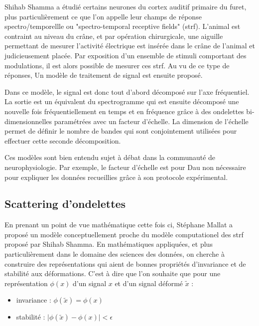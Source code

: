 Shihab Shamma a étudié certains neurones du cortex auditif primaire du furet, plus particulièrement ce que l'on appelle leur champs de réponse spectro/temporellle ou "spectro-temporal receptive fields" (strf). L'animal est contraint au niveau du crâne, et par opération chirurgicale, une aiguille permettant de mesurer l'activité électrique est insérée dans le crâne de l'animal et judicieusement placée. Par exposition d'un ensemble de stimuli comportant des modulations, il est alors possible de mesurer ces strf. Au vu de ce type de réponses, Un modèle de traitement de signal est ensuite proposé.

Dans ce modèle, le signal est donc tout d'abord décomposé sur l'axe fréquentiel. La sortie est un équivalent du spectrogramme qui est ensuite décomposé une nouvelle fois fréquentiellement en temps et en fréquence grâce à des ondelettes bi-dimensionnelles paramétrées avec un facteur d'échelle. La dimension de l'échelle permet de définir le nombre de bandes qui sont conjointement utilisées pour effectuer cette seconde décomposition.

Ces modèles sont bien entendu sujet à débat dans la communauté de neurophysiologie. Par exemple, le facteur d'échelle est pour Dau non nécessaire pour expliquer les données recueillies grâce à son protocole expérimental.

\subsection{\nmu Scattering d'ondelettes}  \label{sec:scattering}

En prenant un point de vue mathématique cette fois ci, Stéphane Mallat a proposé un modèle conceptuellement proche du modèle computationel des strf proposé par Shihab Shamma. En mathématiques appliquées, et plus particulièrement dans le domaine des sciences des données, on cherche à construire des représentations qui aient de bonnes propriétés d'invariance et de stabilité aux déformations. C'est à dire que l'on souhaite que pour une représentation $\phi(x)$ d'un signal $x$ et d'un signal déformé $\tilde x$ :
\begin{itemize}
  \item invariance : $\phi(\tilde x) = \phi(x)$
  \item stabilité : $ \vert \phi(\tilde x) - \phi(x) | < \epsilon $
\end{itemize}

